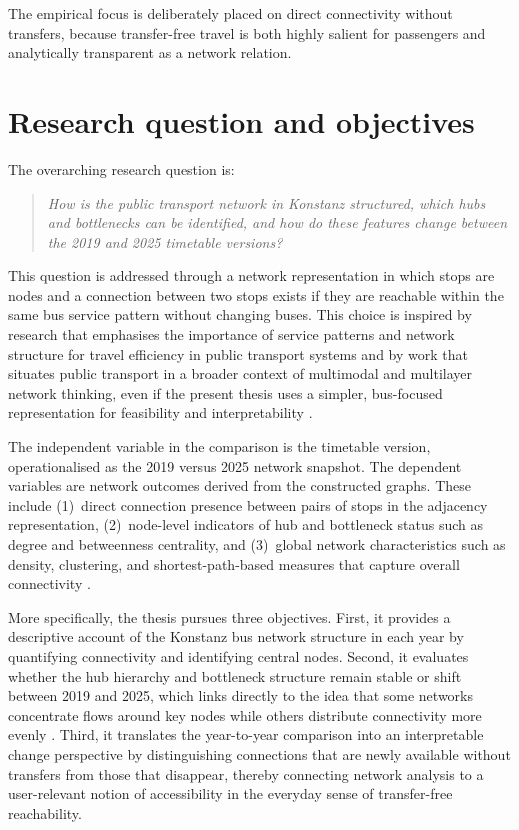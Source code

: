 \documentclass[12pt,a4paper,oneside]{report}
\begin{document}
The empirical focus is deliberately placed on direct connectivity without transfers, because transfer-free travel is both highly salient for passengers and analytically transparent as a network relation.

\section{Research question and objectives}\label{sec:research-question}

The overarching research question is:

\begin{quote}
\emph{How is the public transport network in Konstanz structured, which hubs and bottlenecks can be identified, and how do these features change between the 2019 and 2025 timetable versions?}
\end{quote}

This question is addressed through a network representation in which stops are nodes and a connection between two stops exists if they are reachable within the same bus service pattern without changing buses.
This choice is inspired by research that emphasises the importance of service patterns and network structure for travel efficiency in public transport systems \citep{gallotti2014} and by work that situates public transport in a broader context of multimodal and multilayer network thinking, even if the present thesis uses a simpler, bus-focused representation for feasibility and interpretability \citep{alessandretti2022,artime2022}.

The independent variable in the comparison is the timetable version, operationalised as the 2019 versus 2025 network snapshot.
The dependent variables are network outcomes derived from the constructed graphs.
These include (1)~direct connection presence between pairs of stops in the adjacency representation, (2)~node-level indicators of hub and bottleneck status such as degree and betweenness centrality, and (3)~global network characteristics such as density, clustering, and shortest-path-based measures that capture overall connectivity \citep{barthelemy2011,derrible2010}.

More specifically, the thesis pursues three objectives.
First, it provides a descriptive account of the Konstanz bus network structure in each year by quantifying connectivity and identifying central nodes.
Second, it evaluates whether the hub hierarchy and bottleneck structure remain stable or shift between 2019 and 2025, which links directly to the idea that some networks concentrate flows around key nodes while others distribute connectivity more evenly \citep{derrible2010}.
Third, it translates the year-to-year comparison into an interpretable change perspective by distinguishing connections that are newly available without transfers from those that disappear, thereby connecting network analysis to a user-relevant notion of accessibility in the everyday sense of transfer-free reachability.
\end{document}
